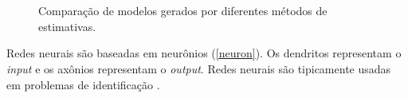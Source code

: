 \begin{figure}[H] 
    \caption{Comparação de modelos gerados por diferentes métodos de estimativas.} \label{comparation}
     \centering
     \\
     \\
\end{figure}

Redes neurais são baseadas em neurônios (\autoref{neuron}). Os dendritos representam o \textit{input} e os axônios representam o \textit{output}. Redes neurais são tipicamente usadas em problemas de identificação \cite{samson_intro_ml}.

